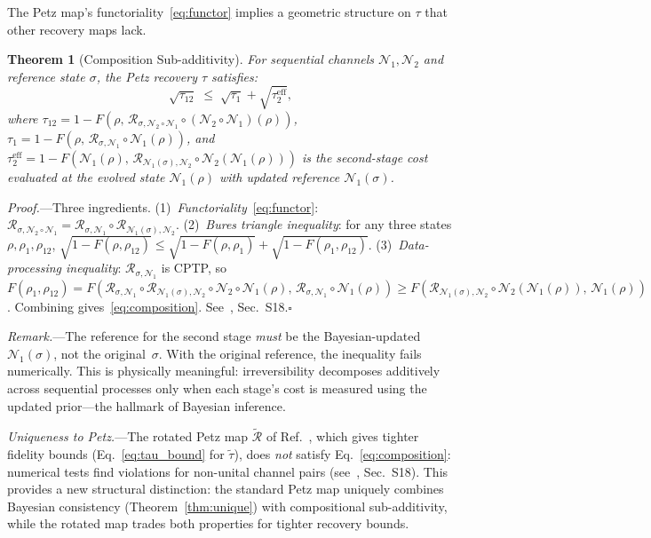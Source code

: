 \documentclass[prl,twocolumn,superscriptaddress,longbibliography,floatfix]{revtex4-2}
\newtheorem{theorem}{Theorem}
\newcommand{\Petz}{\mathcal{R}}
\newcommand{\chan}{\mathcal{N}}
\newcommand{\tauasym}{\tau}
\newcommand{\taurot}{\tilde{\tau}}
\begin{document}
The Petz map's functoriality~\eqref{eq:functor} implies a
geometric structure on $\tauasym$ that other recovery maps lack.

\begin{theorem}[Composition Sub-additivity]
\label{thm:composition}
For sequential channels $\chan_1, \chan_2$ and reference state
$\sigma$, the Petz recovery $\tauasym$ satisfies:
\begin{equation}
\sqrt{\tauasym_{12}} \;\leq\; \sqrt{\tauasym_1}
  + \sqrt{\tauasym_2^{\mathrm{eff}}},
\label{eq:composition}
\end{equation}
where $\tauasym_{12} = 1 - F(\rho,\,\Petz_{\sigma,\chan_2\circ\chan_1}
\circ (\chan_2\!\circ\!\chan_1)(\rho))$,\;
$\tauasym_1 = 1 - F(\rho,\,\Petz_{\sigma,\chan_1}
\circ \chan_1(\rho))$,\;
and $\tauasym_2^{\mathrm{eff}} =
1 - F(\chan_1(\rho),\,
\Petz_{\chan_1(\sigma),\chan_2}
\circ \chan_2(\chan_1(\rho)))$
is the second-stage cost evaluated at the
\emph{evolved} state $\chan_1(\rho)$ with \emph{updated}
reference $\chan_1(\sigma)$.
\end{theorem}

\emph{Proof.}---Three ingredients.
(1)~\emph{Functoriality}~\eqref{eq:functor}:
$\Petz_{\sigma,\chan_2\circ\chan_1} =
\Petz_{\sigma,\chan_1} \circ
\Petz_{\chan_1(\sigma),\chan_2}$.
(2)~\emph{Bures triangle inequality}: for any three states
$\rho, \rho_1, \rho_{12}$,
$\sqrt{1-F(\rho,\rho_{12})} \leq
\sqrt{1-F(\rho,\rho_1)} +
\sqrt{1-F(\rho_1,\rho_{12})}$.
(3)~\emph{Data-processing inequality}:
$\Petz_{\sigma,\chan_1}$ is CPTP, so
$F(\rho_1, \rho_{12}) =
F(\Petz_{\sigma,\chan_1}\circ\Petz_{\chan_1(\sigma),\chan_2}
\circ\chan_2\circ\chan_1(\rho),\,
\Petz_{\sigma,\chan_1}\circ\chan_1(\rho))
\geq F(\Petz_{\chan_1(\sigma),\chan_2}
\circ\chan_2(\chan_1(\rho)),\, \chan_1(\rho))$.
Combining gives~\eqref{eq:composition}.
See~\cite{SM}, Sec.~S18.\hfill$\square$

\emph{Remark.}---The reference for the second stage
\emph{must} be the Bayesian-updated $\chan_1(\sigma)$, not the
original~$\sigma$.  With the original reference, the inequality
fails numerically.  This is physically meaningful:
irreversibility decomposes additively across sequential
processes only when each stage's cost is measured using the
updated prior---the hallmark of Bayesian inference.

\emph{Uniqueness to Petz.}---The rotated Petz map
$\tilde{\Petz}$ of Ref.~\cite{Junge2018}, which gives tighter
fidelity bounds (Eq.~\eqref{eq:tau_bound} for $\taurot$),
does \emph{not} satisfy
Eq.~\eqref{eq:composition}: numerical tests find violations
for non-unital channel pairs (see~\cite{SM}, Sec.~S18).
This provides a new structural distinction: the standard Petz
map uniquely combines Bayesian consistency
(Theorem~\ref{thm:unique}) with compositional
sub-additivity, while the rotated map trades both properties
for tighter recovery bounds.
\end{document}
